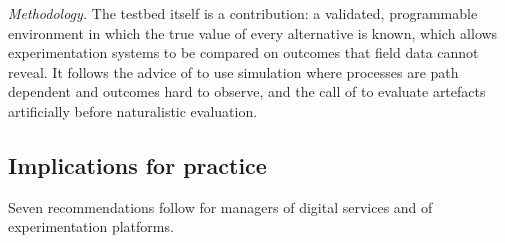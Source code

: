 \documentclass[preprint,12pt,authoryear]{elsarticle}
\theoremstyle{definition}
\begin{document}
\emph{Methodology.} The testbed itself is a contribution: a validated, programmable environment in which the true value of every alternative is known, which allows experimentation systems to be compared on outcomes that field data cannot reveal. It follows the advice of \citet{davis2007} to use simulation where processes are path dependent and outcomes hard to observe, and the call of \citet{venable2016} to evaluate artefacts artificially before naturalistic evaluation.

\subsection{Implications for practice}

Seven recommendations follow for managers of digital services and of experimentation platforms.
\end{document}
